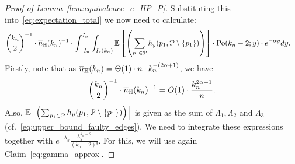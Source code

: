 \begin{proof}[Proof of Lemma~\ref{lem:equivalence_c_HP_P}]
Substituting this into~\eqref{eq:expectation_total} we now need to calculate:
\begin{align*}
&{k_n\choose 2}^{-1}\cdot \expH^{-1} \cdot \int_{-I_n}^{I_n} 
\int_{I_\eps(k_n)} \Exp{\left( \sum_{p_1 \in \Pcal} h_y (p_1, \Pcal \setminus \{ p_1 \})\right)} \cdot 
 \Pop{y}{k_n-2} \cdot e^{-\alpha y} dy.
\end{align*}
Firstly, note that as $\expH = \Theta (1) \cdot n \cdot k_n^{-(2\alpha +1)}$, we have 
$$ {k_n\choose 2}^{-1}\cdot \expH^{-1} = O(1) \cdot \frac{k_n^{2\alpha-1}}{n}.$$
Also, $\Exp{\left( \sum_{p_1 \in \Pcal} h_y (p_1, \Pcal \setminus \{ p_1 \})\right)}$ is given 
as the sum of $\Lambda_1, \Lambda_2$ and $\Lambda_3$ (cf.~\eqref{eq:upper_bound_faulty_edges}). 
We need to integrate these expressions together with $e^{-\lambda_y} \frac{\lambda_y^{k_n-2}}{(k_n-2)!}$.
For this, we will use again Claim~\ref{eq:gamma_approx}.



\end{proof}
